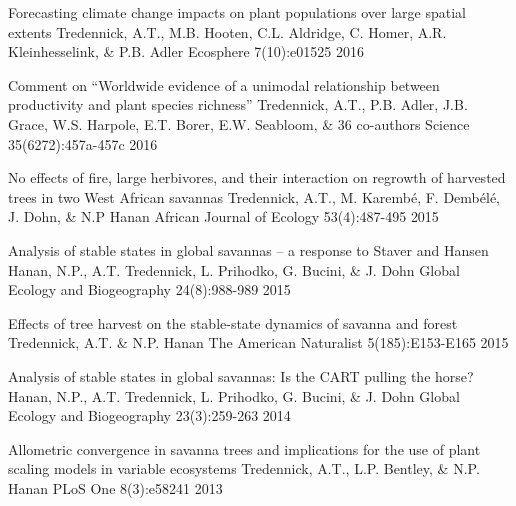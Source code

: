 \begin{pubentries}
  \pubentry
    {Forecasting climate change impacts on plant populations over large spatial extents} %
    {Tredennick, A.T., M.B. Hooten, C.L. Aldridge, C. Homer, A.R. Kleinhesselink, \& P.B. Adler} %
    {Ecosphere} %
    {7(10):e01525} %
    {2016} %

  \pubentry
    {Comment on “Worldwide evidence of a unimodal relationship between productivity and plant species
richness”} %
    {Tredennick, A.T., P.B. Adler, J.B. Grace, W.S. Harpole, E.T. Borer, E.W. Seabloom, \& 36 co-authors} %
    {Science} %
    {35(6272):457a-457c} %
    {2016} %

  \pubentry
    {No effects of fire, large herbivores, and their interaction on regrowth of harvested trees in two West African savannas} %
    {Tredennick, A.T., M. Karemb\'{e}, F. Demb\'{e}l\'{e}, J. Dohn, \& N.P Hanan} %
    {African Journal of Ecology} %
    {53(4):487-495} %
    {2015} %

  \pubentry
    {Analysis of stable states in global savannas – a response to Staver and Hansen} %
    {Hanan, N.P., A.T. Tredennick, L. Prihodko, G. Bucini, \& J. Dohn} %
    {Global Ecology and Biogeography} %
    {24(8):988-989} %
    {2015} %

  \pubentry
    {Effects of tree harvest on the stable-state dynamics of savanna and forest} %
    {Tredennick, A.T. \& N.P. Hanan} %
    {The American Naturalist} %
    {5(185):E153-E165} %
    {2015} %

  \pubentry
    {Analysis of stable states in global savannas: Is the CART pulling the horse?} %
    {Hanan, N.P., A.T. Tredennick, L. Prihodko, G. Bucini, \& J. Dohn} %
    {Global Ecology and Biogeography} %
    {23(3):259-263} %
    {2014} %

  \pubentry
    {Allometric convergence in savanna trees and implications for the use of plant scaling models in variable ecosystems} %
    {Tredennick, A.T., L.P. Bentley, \& N.P. Hanan} %
    {PLoS One} %
    {8(3):e58241} %
    {2013} %


\end{pubentries}
